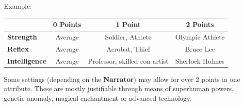 Example:

\begin{center}
    \begin{tabular}{|l|c c c|} 
     \hline
       & \textbf{0 Points} & \textbf{1 Point} & \textbf{2 Points} \\ 
     \hline
     \textbf{Strength} & Average & Soldier, Athlete & Olympic Athlete \\ 
     \textbf{Reflex} & Average & Acrobat, Thief & Bruce Lee \\
     \textbf{Intelligence} & Average & Professor, skilled con artist & Sherlock Holmes \\
     \hline
    \end{tabular}
\end{center}

Some settings (depending on the \textbf{Narrator}) may allow for over 2 points in one attribute. These are mostly justifiable through means of superhuman powers, genetic anomaly, magical enchantment or advanced technology.
